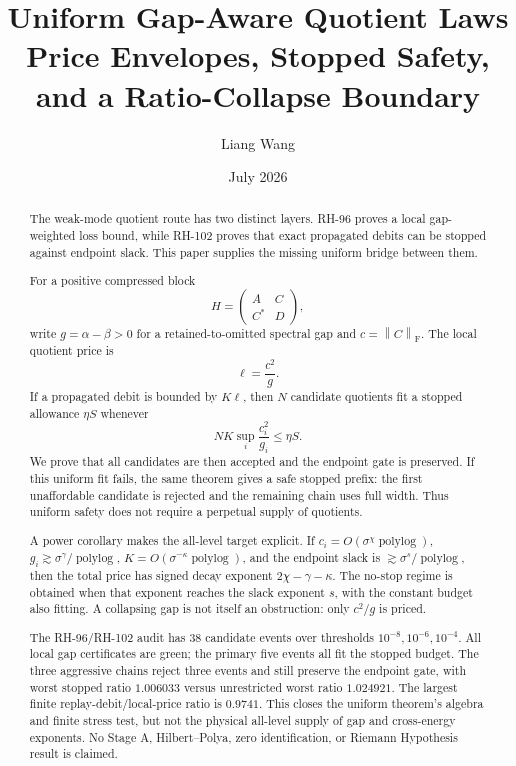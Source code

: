 \documentclass[11pt]{article}
\title{Uniform Gap-Aware Quotient Laws\\
\large Price Envelopes, Stopped Safety, and a Ratio-Collapse Boundary}
\author{Liang Wang}
\date{July 2026}
\theoremstyle{definition}
\theoremstyle{remark}
\newcommand{\norm}[1]{\left\lVert#1\right\rVert}
\newcommand{\F}{\mathrm F}
\begin{document}
\maketitle

\begin{abstract}
The weak-mode quotient route has two distinct layers.  RH-96 proves a local
gap-weighted loss bound, while RH-102 proves that exact propagated debits can
be stopped against endpoint slack.  This paper supplies the missing uniform
bridge between them.

For a positive compressed block
\[
 H=\begin{pmatrix}A&C\\C^*&D\end{pmatrix},
\]
write $g=\alpha-\beta>0$ for a retained-to-omitted spectral gap and
$c=\norm C_{\F}$.  The local quotient price is
\[
 \ell=\frac{c^2}{g}.
\]
If a propagated debit is bounded by $K\ell$, then $N$ candidate quotients
fit a stopped allowance $\eta S$ whenever
\[
 N K\sup_i\frac{c_i^2}{g_i}\le\eta S.
\]
We prove that all candidates are then accepted and the endpoint gate is
preserved.  If this uniform fit fails, the same theorem gives a safe stopped
prefix: the first unaffordable candidate is rejected and the remaining chain
uses full width.  Thus uniform safety does not require a perpetual supply of
quotients.

A power corollary makes the all-level target explicit.  If
$c_i=O(\sigma^\chi\operatorname{polylog})$,
$g_i\gtrsim\sigma^\gamma/\operatorname{polylog}$,
$K=O(\sigma^{-\kappa}\operatorname{polylog})$, and the endpoint slack is
$\gtrsim\sigma^s/\operatorname{polylog}$, then the total price has signed
decay exponent $2\chi-\gamma-\kappa$.  The no-stop regime is obtained when
that exponent reaches the slack exponent $s$, with the constant budget also
fitting.  A collapsing gap is not itself an obstruction: only $c^2/g$ is
priced.

The RH-96/RH-102 audit has 38 candidate events over thresholds
$10^{-8},10^{-6},10^{-4}$.  All local gap certificates are green; the primary
five events all fit the stopped budget.  The three aggressive chains reject
three events and still preserve the endpoint gate, with worst stopped ratio
$1.006033$ versus unrestricted worst ratio $1.024921$.  The largest finite
replay-debit/local-price ratio is $0.9741$.  This closes the uniform theorem's
algebra and finite stress test, but not the physical all-level supply of gap
and cross-energy exponents.  No Stage A, Hilbert--Polya, zero identification,
or Riemann Hypothesis result is claimed.
\end{abstract}
\end{document}
